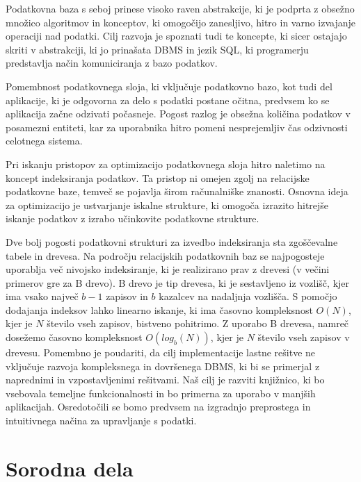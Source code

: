 \documentclass[a4paper,12pt,openright]{book}
\begin{document}
    Podatkovna baza s seboj prinese visoko raven abstrakcije, ki je podprta z obsežno množico algoritmov in konceptov, ki omogočijo zanesljivo, hitro in varno izvajanje operaciji nad podatki. Cilj razvoja je spoznati tudi te koncepte, ki sicer ostajajo skriti v abstrakciji, ki jo prinašata DBMS in jezik SQL, ki programerju predstavlja način komuniciranja z bazo podatkov.

    Pomembnost podatkovnega sloja, ki vključuje podatkovno bazo, kot tudi del aplikacije, ki je odgovorna za delo s podatki postane očitna, predvsem ko se aplikacija začne odzivati počasneje. Pogost razlog je obsežna količina podatkov v posamezni entiteti, kar za uporabnika hitro pomeni nesprejemljiv čas odzivnosti celotnega sistema.

    Pri iskanju pristopov za optimizacijo podatkovnega sloja hitro naletimo na koncept indeksiranja podatkov. Ta pristop ni omejen zgolj na relacijske podatkovne baze, temveč se pojavlja širom računalniške znanosti. Osnovna ideja za optimizacijo je ustvarjanje iskalne strukture, ki omogoča izrazito hitrejše iskanje podatkov z izrabo učinkovite podatkovne strukture.
    
    Dve bolj pogosti podatkovni strukturi za izvedbo indeksiranja sta zgoščevalne tabele in drevesa. Na področju relacijskih podatkovnih baz se najpogosteje uporablja več nivojsko indeksiranje, ki je realizirano prav z drevesi (v večini primerov gre za B drevo). B drevo je tip drevesa, ki je sestavljeno iz vozlišč, kjer ima vsako največ $b - 1$ zapisov in $b$ kazalcev na nadaljnja vozlišča. S pomočjo dodajanja indeksov lahko linearno iskanje, ki ima časovno kompleksnost $O(N)$, kjer je $N$ število vseh zapisov, bistveno pohitrimo. Z uporabo B drevesa, namreč dosežemo časovno kompleksnost $O(log_b(N))$, kjer je $N$ število vseh zapisov v drevesu.
    \newline
    \newline
    \noindent
    Pomembno je poudariti, da cilj implementacije lastne rešitve ne vključuje razvoja kompleksnega in dovršenega DBMS, ki bi se primerjal z naprednimi in vzpostavljenimi rešitvami. Naš cilj je razviti knjižnico, ki bo vsebovala temeljne funkcionalnosti in bo primerna za uporabo v manjših aplikacijah. Osredotočili se bomo predvsem na izgradnjo preprostega in intuitivnega načina za upravljanje s podatki.

\chapter{Sorodna dela}
\end{document}
